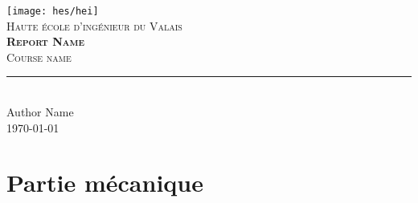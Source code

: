 \documentclass[11pt,titlepage]{report}
\begin{document}
\begin{titlepage}
	\centering
    \texttt{[image: hes/hei]}\\[1cm] 	%
    \textsc{\LARGE Haute école d'ingénieur du Valais}\\ \vspace{\fill}
    \textbf{\textsc{\fontsize{35}{35}\selectfont Report Name}}\\ \vspace{\fill}
	\textsc{\LARGE Course name}\\[0.4cm]
	\rule{\linewidth}{0.2 mm} \\[0.5 cm]
	Author Name \\
	\today
\end{titlepage}
\restoregeometry

\tableofcontents

\chapter{Partie mécanique}

\end{document}
